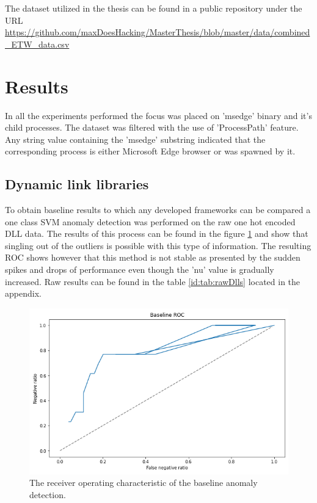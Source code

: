 \documentclass[a4paper,twoside,12pt]{book}
\begin{document}
The dataset utilized in the thesis can be found in a public repository under the URL 
\url{https://github.com/maxDoesHacking/MasterThesis/blob/master/data/combined_ETW_data.csv}


\section{Results}

In all the experiments performed the focus was placed on 'msedge' binary and it's child processes.
The dataset was filtered with the use of 'ProcessPath' feature. Any string value containing the 'msedge'
substring indicated that the corresponding process is either Microsoft Edge browser or was spawned by it. 

\subsection{Dynamic link libraries}
To obtain baseline results to which any developed frameworks can be compared a one class SVM anomaly 
detection was performed on the raw one hot encoded DLL data. The results of this process can be found
in the figure \ref{fig:DLLBaselineROC} and show that singling out of the outliers is possible with this type 
of information. The resulting ROC shows however that this method is not stable as presented by the sudden spikes
and drops of performance even though the 'nu' value is gradually increased. 
Raw results can be found in the table \ref{id:tab:rawDlls} located in the appendix. 

\begin{figure}
	\centering
	\includegraphics{images/DLLBaselineROCKF}
	\caption{The receiver operating characteristic of the baseline anomaly detection.}
	\label{fig:DLLBaselineROC}
 \end{figure}
	
\end{document}
